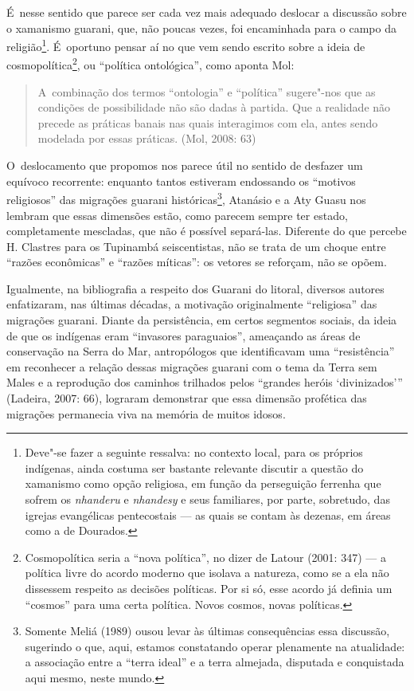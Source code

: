 É~nesse sentido que parece ser cada vez mais adequado deslocar a
discussão sobre o xamanismo guarani, que, não poucas vezes, foi
encaminhada para o campo da religião\footnote{Deve"-se fazer a seguinte
ressalva: no contexto local, para os próprios indígenas, ainda costuma
ser bastante relevante discutir a questão do xamanismo como opção
religiosa, em função da perseguição ferrenha que sofrem os \emph{nhanderu} e
\emph{nhandesy} e seus familiares, por parte, sobretudo, das igrejas
evangélicas pentecostais --- as quais se contam às dezenas, em áreas como
a de Dourados.}. É~oportuno pensar aí no que vem sendo escrito sobre
a ideia de cosmopolítica\footnote{Cosmopolítica seria a ``nova
política'', no dizer de Latour (2001: 347) --- a política livre do acordo
moderno que isolava a natureza, como se a ela não dissessem respeito as
decisões políticas. Por si só, esse acordo já definia um ``cosmos'' para
uma certa política. Novos cosmos, novas políticas.}, ou ``política
ontológica'', como aponta Mol: 

\begin{quote}
\noindent
A~combinação dos termos ``ontologia'' e ``política'' sugere"-nos que as
condições de possibilidade não são dadas à partida. Que a realidade não
precede as práticas banais nas quais interagimos com ela, antes sendo
modelada por essas práticas. (Mol, 2008: 63)
\end{quote}

O~deslocamento que propomos nos parece útil no sentido de desfazer um
equívoco recorrente: enquanto tantos estiveram endossando os ``motivos
religiosos'' das migrações guarani históricas\footnote{Somente Meliá
(1989) ousou levar às últimas consequências essa discussão, sugerindo o
que, aqui, estamos constatando operar plenamente na atualidade: a
associação entre a ``terra ideal'' e a terra almejada, disputada e
conquistada aqui mesmo, neste mundo.}, Atanásio e a Aty Guasu nos
lembram que essas dimensões estão, como parecem sempre ter estado,
completamente mescladas, que não é possível separá-las. Diferente do
que percebe H. Clastres para os Tupinambá seiscentistas, não se trata
de um choque entre ``razões econômicas'' e ``razões míticas'': os vetores
se reforçam, não se opõem.

Igualmente, na bibliografia a respeito dos Guarani do litoral, diversos
autores enfatizaram, nas últimas décadas, a motivação originalmente
``religiosa'' das migrações guarani. Diante da persistência, em certos
segmentos sociais, da ideia de que os indígenas eram ``invasores
paraguaios'', ameaçando as áreas de conservação na Serra do Mar,
antropólogos que identificavam uma ``resistência'' em reconhecer a
relação dessas migrações guarani com o tema da Terra sem Males e a
reprodução dos caminhos trilhados pelos ``grandes heróis ‘divinizados’''
(Ladeira, 2007: 66), lograram demonstrar que essa dimensão profética
das migrações permanecia viva na memória de muitos idosos. 

